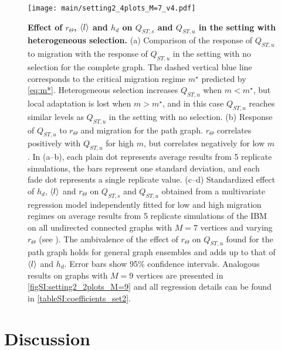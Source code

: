 \begin{figure}[ht] 
    \centering
      \texttt{[image: main/setting2\_4plots\_M=7\_v4.pdf]}
    \caption{\textbf{Effect of $r_\Theta$, $\langle l \rangle$ and $h_d$ on $Q_{ST,s}$ and $Q_{ST,u}$ in the setting with heterogeneous selection.}
    (a) Comparison of the response of $Q_{ST,u}$ to migration with the response of $Q_{ST,u}$ in the setting with no selection for the complete graph. The dashed vertical blue line corresponds to the critical migration regime $m^\star$ predicted by \cref{eq:m*}. Heterogeneous selection increases $Q_{ST,u}$ when $m < m^\star$, but local adaptation is lost when $m > m^\star$, and in this case $Q_{ST,u}$ reaches similar levels as $Q_{ST,u}$ in the setting with no selection. 
    (b) Response of $Q_{ST,u}$ to $r_\Theta$ and migration for the path graph. $r_\Theta$ correlates positively with $Q_{ST,u}$ for high $m$, but correlates negatively for low $m$.
    In (a--b), each plain dot represents average results from 5 replicate simulations, the bars represent one standard deviation, and each fade dot represents a single replicate value.
    (c--d) Standardized effect of $h_d$, $\langle l \rangle$ and $r_\Theta$ on $Q_{ST,s}$ and $Q_{ST,u}$ obtained from a multivariate regression model independently fitted for low and high migration regimes on average results from 5 replicate simulations of the IBM on all undirected connected graphs with $M=7$ vertices and varying $r_\Theta$ (see ).
    The ambivalence of the effect of $r_\Theta$ on $Q_{ST,u}$ found for the path graph holds for general graph ensembles and adds up to that of $\langle l \rangle$ and $h_d$.
    Error bars show 95\% confidence intervals.
    Analogous results on graphs with $M=9$ vertices are presented in \cref{figSI:setting2_2plots_M=9} and all regression details can be found in \cref{tableSI:coefficients_set2}.
    }
    \label{fig:setting2_4plots_M=7}
\end{figure}
\FloatBarrier
\section{Discussion}


